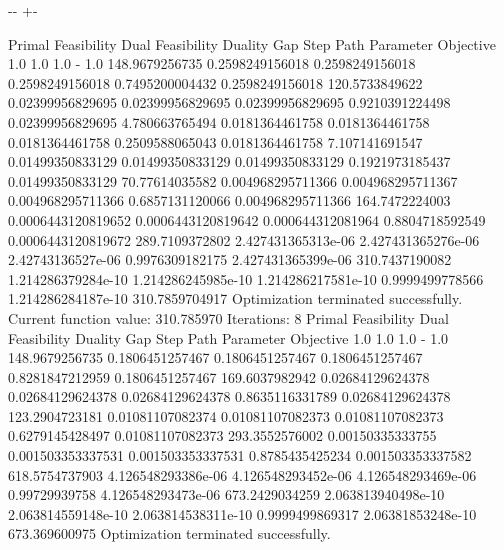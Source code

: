 \documentclass[letterpaper,10pt,english]{sphinxmanual}
\newlength\nbsphinxcodecellspacing
\begin{document}
{

\kern-\sphinxverbatimsmallskipamount\kern-\baselineskip
\kern+\FrameHeightAdjust\kern-\fboxrule
\vspace{\nbsphinxcodecellspacing}

\begin{sphinxVerbatim}[commandchars=\\\{\}]
Primal Feasibility  Dual Feasibility    Duality Gap         Step             Path Parameter      Objective
1.0                 1.0                 1.0                 -                1.0                 148.9679256735
0.2598249156018     0.2598249156018     0.2598249156018     0.7495200004432  0.2598249156018     120.5733849622
0.02399956829695    0.02399956829695    0.02399956829695    0.9210391224498  0.02399956829695    4.780663765494
0.0181364461758     0.0181364461758     0.0181364461758     0.2509588065043  0.0181364461758     7.107141691547
0.01499350833129    0.01499350833129    0.01499350833129    0.1921973185437  0.01499350833129    70.77614035582
0.004968295711366   0.004968295711367   0.004968295711366   0.6857131120066  0.004968295711366   164.7472224003
0.0006443120819652  0.0006443120819642  0.000644312081964   0.8804718592549  0.0006443120819672  289.7109372802
2.427431365313e-06  2.427431365276e-06  2.42743136527e-06   0.9976309182175  2.427431365399e-06  310.7437190082
1.214286379284e-10  1.214286245985e-10  1.214286217581e-10  0.9999499778566  1.214286284187e-10  310.7859704917
Optimization terminated successfully.
         Current function value: 310.785970
         Iterations: 8
Primal Feasibility  Dual Feasibility    Duality Gap         Step             Path Parameter      Objective
1.0                 1.0                 1.0                 -                1.0                 148.9679256735
0.1806451257467     0.1806451257467     0.1806451257467     0.8281847212959  0.1806451257467     169.6037982942
0.02684129624378    0.02684129624378    0.02684129624378    0.8635116331789  0.02684129624378    123.2904723181
0.01081107082374    0.01081107082373    0.01081107082373    0.6279145428497  0.01081107082373    293.3552576002
0.00150335333755    0.001503353337531   0.001503353337531   0.8785435425234  0.001503353337582   618.5754737903
4.126548293386e-06  4.126548293452e-06  4.126548293469e-06  0.99729939758    4.126548293473e-06  673.2429034259
2.063813940498e-10  2.063814559148e-10  2.063814538311e-10  0.9999499869317  2.06381853248e-10   673.369600975
Optimization terminated successfully.

\end{sphinxVerbatim}}
\end{document}
